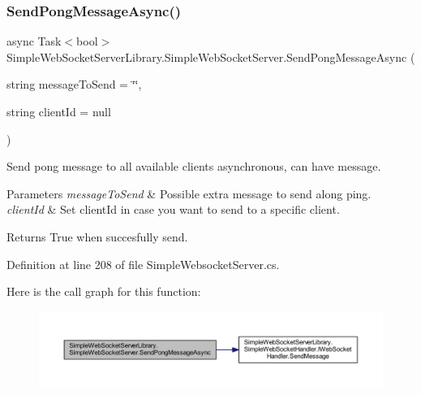\subsubsection{\texorpdfstring{Send\+Pong\+Message\+Async()}{SendPongMessageAsync()}}
{\footnotesize\ttfamily async Task$<$bool$>$ Simple\+Web\+Socket\+Server\+Library.\+Simple\+Web\+Socket\+Server.\+Send\+Pong\+Message\+Async (\begin{DoxyParamCaption}\item[{string}]{message\+To\+Send = {\ttfamily \char`\"{}\char`\"{}},  }\item[{string}]{client\+Id = {\ttfamily null} }\end{DoxyParamCaption})}



Send pong message to all available clients asynchronous, can have message. 


\begin{DoxyParams}{Parameters}
{\em message\+To\+Send} & Possible extra message to send along ping.\\
\hline
{\em client\+Id} & Set client\+Id in case you want to send to a specific client.\\
\hline
\end{DoxyParams}
\begin{DoxyReturn}{Returns}
True when succesfully send.
\end{DoxyReturn}


Definition at line 208 of file Simple\+Websocket\+Server.\+cs.

Here is the call graph for this function\+:
\nopagebreak
\begin{figure}[H]
\begin{center}
\leavevmode
\includegraphics[width=350pt]{class_simple_web_socket_server_library_1_1_simple_web_socket_server_a20bd2a898b9465f492a5b19c4a8e1021_cgraph}
\end{center}
\end{figure}
\mbox{\label{class_simple_web_socket_server_library_1_1_simple_web_socket_server_a4ea5479402f769e2e73a8bcc06b654b1}} 
